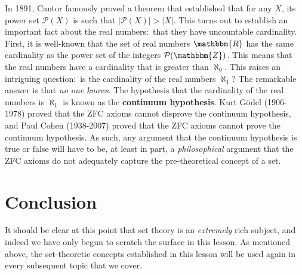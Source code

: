 \documentclass[11pt]{article}
\theoremstyle{definition}
\theoremstyle{remark}
\begin{document}
In 1891, Cantor famously proved a theorem that established that for any $X$, its power set $\mathcal{P}(X)$ is such that $|\mathcal{P}(X)|>|X|$. This turns out to establish an important fact about the real numbers:\ that they have uncountable cardinality. First, it is well-known that the set of real numbers $\mathbbm{R}$ has the same cardinality as the power set of the integers $\mathcal{P}(\mathbbm{Z})$. This means that the real numbers have a cardinality that is greater than $\aleph_{0}$. This raises an intriguing question:\ is the cardinality of the real numbers $\aleph_{1}$? The remarkable answer is that \textit{no one knows}. The hypothesis that the cardinality of the real numbers is $\aleph_{1}$ is known as the \textbf{continuum hypothesis}. Kurt G\"odel (1906-1978) proved that the ZFC axioms cannot disprove the continuum hypothesis, and Paul Cohen (1938-2007) proved that the ZFC axioms cannot prove the continuum hypothesis. As such, any argument that the continuum hypothesis is true or false will have to be, at least in part, a \textit{philosophical} argument that the ZFC axioms do not adequately capture the pre-theoretical concept of a set.\par 

\section{Conclusion}
It should be clear at this point that set theory is an \textit{extremely} rich subject, and indeed we have only begun to scratch the surface in this lesson. As mentioned above, the set-theoretic concepts established in this lesson will be used again in every subsequent topic that we cover.
\end{document}
